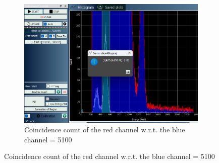 \begin{figure}[H]
    \bigskip
    \begin{subfigure}{\linewidth}
        \centering
        \includegraphics[width=1\textwidth]{images/180/ccred.png}
    \caption{Coincidence count of the red channel w.r.t. the blue channel = 5100}
    \end{subfigure}


\end{figure}


